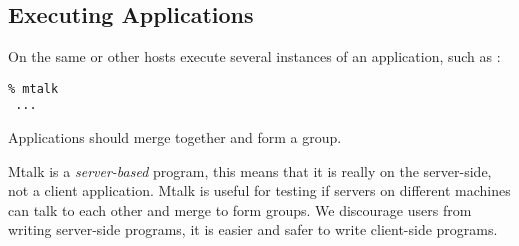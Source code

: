 \subsection{Executing Applications}
On the same or other hosts execute several instances of an
application, such as :
\begin{verbatim}
% mtalk
 ...
\end{verbatim}

Applications should merge together and form a group. 

Mtalk is a {\it server-based} program, this means that it is really on
the server-side, not a client application. Mtalk is useful for testing
if servers on different machines can talk to each other and merge to
form groups. We discourage users from writing server-side programs, it
is easier and safer to write client-side programs. 



